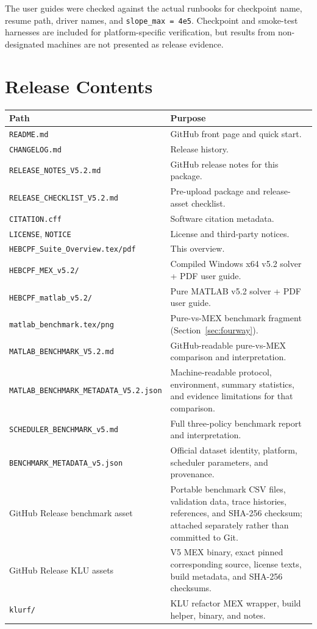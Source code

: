 \documentclass[11pt,a4paper]{article}
\newcommand{\code}[1]{\texttt{#1}}
\begin{document}
The user guides were checked against the actual runbooks for checkpoint name,
resume path, driver names, and \code{slope_max = 4e5}. Checkpoint and smoke-test
harnesses are included for platform-specific verification, but results from
non-designated machines are not presented as release evidence.

\section{Release Contents}

\begin{center}\small
\begin{longtable}{@{}p{}p{}@{}}
\toprule
\textbf{Path} & \textbf{Purpose}\\
\midrule\endhead
\code{README.md} & GitHub front page and quick start.\\
\code{CHANGELOG.md} & Release history.\\
\code{RELEASE_NOTES_V5.2.md} & GitHub release notes for this package.\\
\code{RELEASE_CHECKLIST_V5.2.md} & Pre-upload package and release-asset checklist.\\
\code{CITATION.cff} & Software citation metadata.\\
\code{LICENSE}, \code{NOTICE} & License and third-party notices.\\
\code{HEBCPF_Suite_Overview.tex/pdf} & This overview.\\
\code{HEBCPF_MEX_v5.2/} & Compiled Windows x64 v5.2 solver + PDF user guide.\\
\code{HEBCPF_matlab_v5.2/} & Pure MATLAB v5.2 solver + PDF user guide.\\
\code{matlab_benchmark.tex/png} & Pure-vs-MEX benchmark fragment (Section~\ref{sec:fourway}).\\
\code{MATLAB_BENCHMARK_V5.2.md} & GitHub-readable pure-vs-MEX comparison and interpretation.\\
\code{MATLAB_BENCHMARK_METADATA_V5.2.json} & Machine-readable protocol, environment,
summary statistics, and evidence limitations for that comparison.\\
\code{SCHEDULER_BENCHMARK_v5.md} & Full three-policy benchmark report and interpretation.\\
\code{BENCHMARK_METADATA_v5.json} & Official dataset identity, platform,
scheduler parameters, and provenance.\\
GitHub Release benchmark asset & Portable benchmark CSV files, validation data,
trace histories, references, and SHA-256 checksum; attached separately rather
than committed to Git.\\
GitHub Release KLU assets & V5 MEX binary, exact pinned corresponding source,
license texts, build metadata, and SHA-256 checksums.\\
\code{klurf/} & KLU refactor MEX wrapper, build helper, binary, and notes.\\
\bottomrule
\end{longtable}
\end{center}
\end{document}
